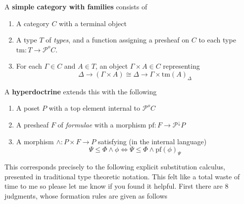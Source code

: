 \documentclass{article}
\newcommand{\ctx}{\,\,\textrm{ctx}}
\newcommand{\ty}{\,\,\textrm{type}}
\newcommand{\pctx}{\,\,\textrm{pctx}}
\newcommand{\form}{\,\,\textrm{formula}}
\newcommand{\el}{\textrm{tm}}
\newcommand{\pf}{\textrm{pf}}
\newcommand{\pipe}{\,|\,}
\newcommand{\psh}{\mathcal P^{o}}
\newcommand{\downsets}{\mathcal P^{\downarrow}}
\begin{document}
A \textbf{simple category with families} consists of
\begin{enumerate}
\item A category $C$ with a terminal object
\item A type $T$ of \emph{types}, and a function assigning a presheaf
  on $C$ to each type $\el : T \to \psh C$.
\item For each $\Gamma \in C$ and $A \in T$, an object $\Gamma \times
  A \in C$ representing
  \[ \Delta \to (\Gamma \times A) \cong \Delta \to \Gamma \times \el(A)_\Delta \]
\end{enumerate}
A \textbf{hyperdoctrine} extends this with the following
\begin{enumerate}
\item A poset $P$ with a top element internal to $\psh C$
\item A presheaf $F$ of \emph{formulae} with a morphism
  $\pf : F \to \downsets P$
\item A morphism $\wedge : P \times F \to P$ satisfying (in the internal language)
  \[ \Psi \leq \Phi \wedge \phi \iff \Psi \leq \Phi \wedge \pf(\phi)_\Psi \]
\end{enumerate}

This corresponds precisely to the following explicit substitution
calculus, presented in traditional type theoretic notation. This felt
like a total waste of time to me so please let me know if you found it
helpful.
%
First there are $8$ judgments, whose formation rules are given as
follows

\end{document}
